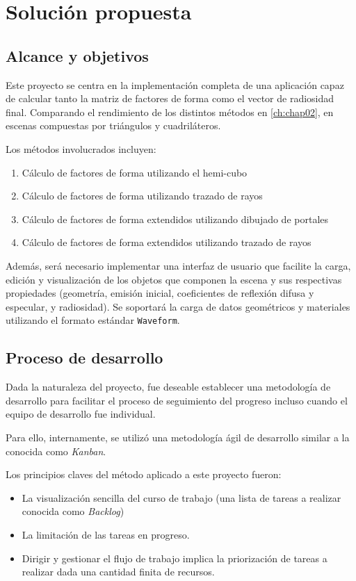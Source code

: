 \chapter{Solución propuesta}
\label{ch:chap03}

\section{Alcance y objetivos}
\label{sec:alcance}

Este proyecto se centra en la implementación completa de una aplicación capaz de calcular tanto la matriz de factores de forma como el vector de radiosidad final. Comparando el rendimiento de los distintos métodos en \ref{ch:chap02}, en escenas compuestas por triángulos y cuadriláteros.

Los métodos involucrados incluyen:

\begin{enumerate}
 	\item Cálculo de factores de forma utilizando el hemi-cubo
 	\item  Cálculo de factores de forma utilizando trazado de rayos
 	\item Cálculo de factores de forma extendidos utilizando dibujado de portales
 	\item Cálculo de factores  de forma extendidos utilizando trazado de rayos
\end{enumerate}

Además, será necesario implementar una interfaz de usuario que facilite la carga, edición y visualización de los objetos que componen la escena y sus respectivas propiedades (geometría, emisión inicial, coeficientes de reflexión difusa y especular, y radiosidad). Se soportará la carga de datos geométricos y materiales utilizando el formato estándar \verb|Waveform|.

\section{Proceso de desarrollo}
\label{sec:procdes}

Dada la naturaleza del proyecto, fue deseable establecer una metodología de desarrollo para facilitar el proceso de seguimiento del progreso incluso cuando el equipo de desarrollo fue individual.

Para ello, internamente, se utilizó una metodología ágil de desarrollo similar a la conocida como \textit{Kanban}.

Los principios claves del método aplicado a este proyecto fueron:
\begin{itemize}
	\item La visualización sencilla del curso de trabajo (una lista de tareas a realizar conocida como \textit{Backlog})
	\item La limitación de las tareas en progreso.
	\item Dirigir y gestionar el flujo de trabajo implica la priorización de tareas a realizar dada una cantidad finita de recursos.
\end{itemize}

